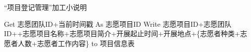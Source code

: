 \begin{algorithm}[H]
    \renewcommand{\thealgorithm}{}
    \caption{“项目登记管理”加工小说明} 
    \label{alg3} 
    \begin{algorithmic}[1]
        \STATE Get 志愿团队ID+当前时间戳 As 志愿项目ID
        \STATE Write 志愿项目ID+志愿团队ID++志愿项目名称+志愿项目简介+开展起止时间+开展地点+\{志愿者种类+志愿者人数+志愿者工作内容\} to 项目信息表
        \ENDIF 
    \end{algorithmic} 
\end{algorithm}